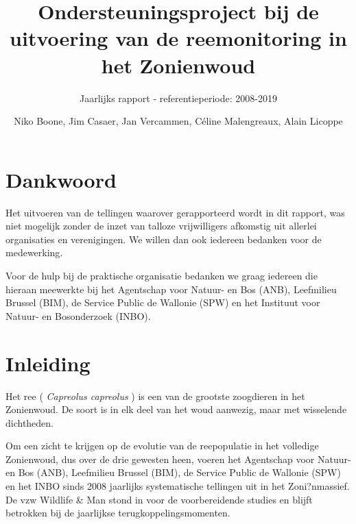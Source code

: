 \documentclass[twoside]{extreport}
\title{Ondersteuningsproject bij de uitvoering van de reemonitoring in het
Zonienwoud}
\subtitle{Jaarlijks rapport - referentieperiode: 2008-2019}
\author{Niko Boone, Jim Casaer, Jan Vercammen, Céline Malengreaux, Alain Licoppe}
\begin{document}
\maketitle
{}



\chapter*{}\label{section}

\chapter*{Dankwoord}\label{dankwoord}

Het uitvoeren van de tellingen waarover gerapporteerd wordt in dit
rapport, was niet mogelijk zonder de inzet van talloze vrijwilligers
afkomstig uit allerlei organisaties en verenigingen. We willen dan ook
iedereen bedanken voor de medewerking.

Voor de hulp bij de praktische organisatie bedanken we graag iedereen
die hieraan meewerkte bij het Agentschap voor Natuur- en Bos (ANB),
Leefmilieu Brussel (BIM), de Service Public de Wallonie (SPW) en het
Instituut voor Natuur- en Bosonderzoek (INBO).


\clearpage

\setcounter{tocdepth}{4}
\tableofcontents
{}

  


\clearpage


\chapter{Inleiding}\label{inleiding}

Het ree ( \emph{Capreolus capreolus} ) is een van de grootste zoogdieren
in het Zonienwoud. De soort is in elk deel van het woud aanwezig, maar
met wisselende dichtheden.

Om een zicht te krijgen op de evolutie van de reepopulatie in het
volledige Zonienwoud, dus over de drie gewesten heen, voeren het
Agentschap voor Natuur- en Bos (ANB), Leefmilieu Brussel (BIM), de
Service Public de Wallonie (SPW) en het INBO sinds 2008 jaarlijks
systematische tellingen uit in het Zoni?nmassief. De vzw Wildlife \& Man
stond in voor de voorbereidende studies en blijft betrokken bij de
jaarlijkse terugkoppelingsmomenten.
\end{document}
